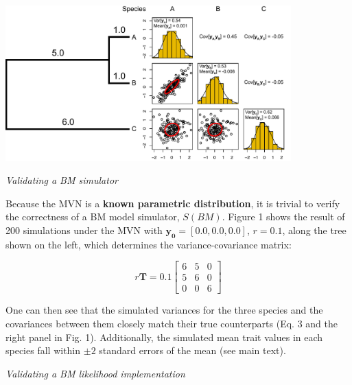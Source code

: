 \documentclass[oneside]{article}
\begin{document}
\begin{tcolorbox}[breakable, width=\textwidth, colback=gray!10, boxrule=0pt,
  title=Box 1: Models with well-known parametric \emph{pdf}'s, fonttitle=\bfseries]
\begin{center}
\includegraphics[width=11cm]{../figures/bmsim.pdf}
\label{fig:bmsim}
\end{center}

\vspace{.25cm}
\emph{Validating a BM simulator}

Because the MVN is a \textbf{known parametric
  distribution}, it is trivial to verify the correctness of a
BM model simulator, $S(BM)$.
Figure 1 shows the result of 200 simulations under the MVN
with $\mathbf{y_0} = [0.0, 0.0, 0.0]$, $r = 0.1$, along the tree shown on
the left, which determines the variance-covariance matrix:

\begin{equation}
  r\mathbf{T} = 0.1
  \begin{bmatrix}
    6 & 5 & 0\\
    5 & 6 & 0\\
    0 & 0 & 6
  \end{bmatrix}
  \label{eq:mat}
\end{equation}

One can then see that the simulated variances for the three species
and the covariances between them closely match their true counterparts
(Eq. 3 and the right panel in Fig. 1).
Additionally, the simulated mean trait values in each species fall
within $\pm 2$
standard errors of the mean (see main text).

\vspace{.25cm}
\emph{Validating a BM likelihood implementation}


\end{tcolorbox}
\end{document}
